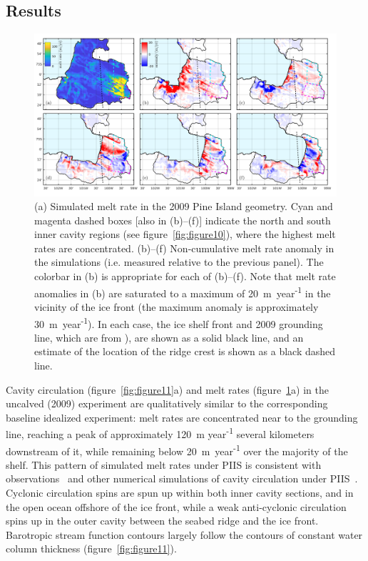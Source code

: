 \documentclass[draft]{agujournal2019}
\begin{document}
\subsection{Results}

\begin{figure}
    \centering
    \includegraphics[width = \textwidth]{plots/figure12.pdf}
    \caption{(a) Simulated melt rate in the 2009 Pine Island geometry. Cyan and magenta dashed boxes [also in (b)--(f)] indicate the north and south inner cavity regions (see figure~\ref{fig:figure10}), where the highest melt rates are concentrated. (b)--(f) Non-cumulative melt rate anomaly in the simulations (i.e. measured relative to the previous panel). The colorbar in (b) is appropriate for each of (b)--(f). Note that melt rate anomalies in (b) are saturated to a maximum of 20~m~year\textsuperscript{-1} in the vicinity of the ice front (the maximum anomaly is approximately 30~m~year\textsuperscript{-1}). In each case, the ice shelf front and 2009 grounding line, which are from ), are shown as a solid black line, and an estimate of the location of the ridge crest is shown as a black dashed line.}
    \label{fig:figure12}
\end{figure}


Cavity circulation (figure~\ref{fig:figure11}a) and melt rates (figure~\ref{fig:figure12}a) in the uncalved (2009) experiment are qualitatively similar to the corresponding baseline idealized experiment: melt rates are concentrated near to the grounding line, reaching a peak of approximately 120~m year\textsuperscript{-1} several kilometers downstream of it, while remaining below 20~m~year\textsuperscript{-1} over the majority of the shelf. This pattern of simulated melt rates under PIIS is consistent with observations~\cite{Dutrieux2013Cryosphere} and other numerical simulations of cavity circulation under PIIS~\cite[for example]{Heimbach2012AnnGlac}. Cyclonic circulation spins are spun up within both inner cavity sections, and in the open ocean offshore of the ice front, while a weak anti-cyclonic circulation spins up in the outer cavity between the seabed ridge and the ice front. Barotropic stream function contours largely follow the contours of constant water column thickness (figure~\ref{fig:figure11}).
\end{document}
